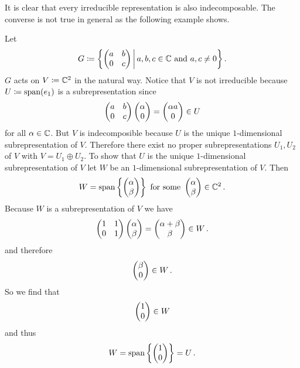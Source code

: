 It is clear that every irreducible representation is also indecomposable.
The converse is not true in general as the following example shows.

\begin{expl}
  Let
  \[
              G
    \coloneqq \left\{
                \begin{pmatrix}
                  a & b \\
                  0 & c
                \end{pmatrix}
              \,\middle|\,
                a, b, c \in \mathbb{C}
                \text{ and }
                a, c \neq 0
              \right\} .
  \]
  $G$ acts on $V \coloneqq \mathbb{C}^2$ in the natural way.
  Notice that $V$ is not irreducible because $U \coloneqq \operatorname{span}(e_1)$ is a subrepresentation since
  \[
        \begin{pmatrix}
          a & b \\
          0 & c 
        \end{pmatrix}
        \begin{pmatrix}\alpha \\ 0\end{pmatrix}
    =   \begin{pmatrix}\alpha a \\ 0\end{pmatrix}
    \in U
  \]
  for all $\alpha \in \mathbb{C}$.
  But $V$ is indecomposible because $U$ is the unique $1$-dimensional subrepresentation of $V$.
  Therefore there exist no proper subrepresentations $U_1, U_2$ of $V$ with $V = U_1 \oplus U_2$.
  To show that $U$ is the unique $1$-dimensional subrepresentation of $V$ let $W$ be an $1$-dimensional subrepresentation of $V$.
  Then
  \[
      W
    = \operatorname{span}\left\{
              \begin{pmatrix}\alpha \\ \beta\end{pmatrix}
            \right\}
    \text{ for some }
        \begin{pmatrix}\alpha \\ \beta\end{pmatrix}
    \in \mathbb{C}^2 \,.
  \]
  Because $W$ is a subrepresentation of $V$ we have
  \[
        \begin{pmatrix}
          1 & 1 \\
          0 & 1
        \end{pmatrix}
        \begin{pmatrix}\alpha \\ \beta\end{pmatrix}
    =   \begin{pmatrix}\alpha + \beta \\ \beta\end{pmatrix}
    \in W \,.
  \]
  and therefore
  \[
    \begin{pmatrix}\beta \\ 0\end{pmatrix} \in W \,.
  \]
  So we find that
  \[
    \begin{pmatrix}1 \\ 0\end{pmatrix} \in W
  \]
  and thus
  \[
      W
    = \operatorname{span} \left\{ \begin{pmatrix}1 \\ 0\end{pmatrix} \right\}
    = U \,.
  \]
\end{expl}


